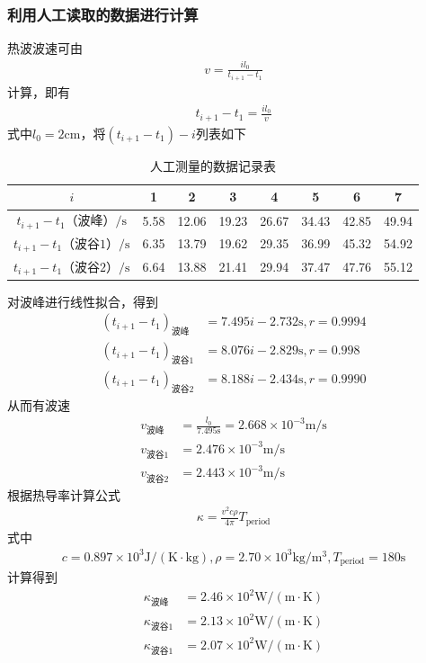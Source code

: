 \documentclass{ctexart}
\begin{document}
	\subsubsection{利用人工读取的数据进行计算}
	热波波速可由
	\begin{align}
		v=\frac{il_0}{t_{i+1}-t_1}
	\end{align}
	计算，即有
	\begin{align}
		t_{i+1}-t_1=\frac{il_0}{v}
	\end{align}
	式中$l_0=2\text{cm}$，将$(t_{i+1}-t_1)-i$列表如下
	\begin{table}[H]
		\begin{center}
			\caption{人工测量的数据记录表}
			\begin{tabular}{c|ccccccc}
				$i$&1&2&3&4&5&6&7\\
				\hline
				$t_{i+1}-t_1\text{（波峰）}/\text{s}$&5.58&12.06&19.23&26.67&34.43&42.85&49.94\\
				\hline
				$t_{i+1}-t_1\text{（波谷1）}/\text{s}$&6.35&13.79&19.62&29.35&36.99&45.32&54.92\\
				\hline
				$t_{i+1}-t_1\text{（波谷2）}/\text{s}$&6.64&13.88&21.41&29.94&37.47&47.76&55.12
			\end{tabular}
		\end{center}
	\end{table}
	对波峰进行线性拟合，得到
	\begin{align}
		(t_{i+1}-t_1)_\text{波峰}&=7.495i-2.732\text{s},r=0.9994\\
		(t_{i+1}-t_1)_\text{波谷1}&=8.076i-2.829\text{s},r=0.998\\
		(t_{i+1}-t_1)_\text{波谷2}&=8.188i-2.434\text{s},r=0.9990
	\end{align}
	从而有波速
	\begin{align}
		v_\text{波峰}&=\frac{l_0}{7.495\text{s}}=2.668\times10^{-3}\text{m/s}\\
		v_\text{波谷1}&=2.476\times10^{-3}\text{m/s}\\
		v_\text{波谷2}&=2.443\times10^{-3}\text{m/s}
	\end{align}
	根据热导率计算公式
	\begin{align}
		\kappa=\frac{v^2c\rho}{4\pi}T_\text{period}
	\end{align}
	式中
	\begin{align}
		c=0.897\times10^3\mathrm{J/(K\cdot kg)},\rho=2.70\times10^3\mathrm{kg/m^3},T_\text{period}=180\mathrm{s}
	\end{align}
	计算得到
	\begin{align}
		\kappa_\text{波峰}&=2.46\times 10^2 \mathrm{W/(m\cdot K)}\\
		\kappa_\text{波谷1}&=2.13\times 10^2 \mathrm{W/(m\cdot K)}\\
		\kappa_\text{波谷1}&=2.07\times 10^2 \mathrm{W/(m\cdot K)}
	\end{align}
\end{document}
